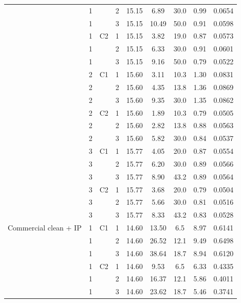{\begin{longtable}{>{\raggedright\arraybackslash}p{2.2cm}llcccccc}
     & 1 &  & 2 & 15.15 & 6.89 & 30.0 & 0.99 & 0.0654 \\
     & 1 &  & 3 & 15.15 & 10.49 & 50.0 & 0.91 & 0.0598 \\
    \addlinespace[2pt]
     & 1 & C2 & 1 & 15.15 & 3.82 & 19.0 & 0.87 & 0.0573 \\
     & 1 &  & 2 & 15.15 & 6.33 & 30.0 & 0.91 & 0.0601 \\
     & 1 &  & 3 & 15.15 & 9.16 & 50.0 & 0.79 & 0.0522 \\
    \addlinespace[2pt]
     & 2 & C1 & 1 & 15.60 & 3.11 & 10.3 & 1.30 & 0.0831 \\
     & 2 &  & 2 & 15.60 & 4.35 & 13.8 & 1.36 & 0.0869 \\
     & 2 &  & 3 & 15.60 & 9.35 & 30.0 & 1.35 & 0.0862 \\
    \addlinespace[2pt]
     & 2 & C2 & 1 & 15.60 & 1.89 & 10.3 & 0.79 & 0.0505 \\
     & 2 &  & 2 & 15.60 & 2.82 & 13.8 & 0.88 & 0.0563 \\
     & 2 &  & 3 & 15.60 & 5.82 & 30.0 & 0.84 & 0.0537 \\
    \addlinespace[2pt]
     & 3 & C1 & 1 & 15.77 & 4.05 & 20.0 & 0.87 & 0.0554 \\
     & 3 &  & 2 & 15.77 & 6.20 & 30.0 & 0.89 & 0.0566 \\
     & 3 &  & 3 & 15.77 & 8.90 & 43.2 & 0.89 & 0.0564 \\
    \addlinespace[2pt]
     & 3 & C2 & 1 & 15.77 & 3.68 & 20.0 & 0.79 & 0.0504 \\
     & 3 &  & 2 & 15.77 & 5.66 & 30.0 & 0.81 & 0.0516 \\
     & 3 &  & 3 & 15.77 & 8.33 & 43.2 & 0.83 & 0.0528 \\
    \midrule
    Commercial clean + IP & 1 & C1 & 1 & 14.60 & 13.50 & 6.5 & 8.97 & 0.6141 \\
     & 1 &  & 2 & 14.60 & 26.52 & 12.1 & 9.49 & 0.6498 \\
     & 1 &  & 3 & 14.60 & 38.64 & 18.7 & 8.94 & 0.6120 \\
    \addlinespace[2pt]
     & 1 & C2 & 1 & 14.60 & 9.53 & 6.5 & 6.33 & 0.4335 \\
     & 1 &  & 2 & 14.60 & 16.37 & 12.1 & 5.86 & 0.4011 \\
     & 1 &  & 3 & 14.60 & 23.62 & 18.7 & 5.46 & 0.3741 \\
  \bottomrule
\end{longtable}}

